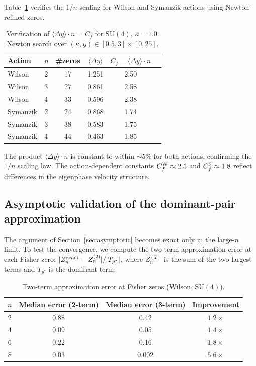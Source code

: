 \documentclass[12pt]{article}
\theoremstyle{definition}
\theoremstyle{remark}
\newcommand{\SU}{\mathrm{SU}}
\newcommand{\avg}[1]{\langle #1 \rangle}
\begin{document}
Table~\ref{tab:scaling} verifies the $1/n$ scaling for Wilson and
Symanzik actions using Newton-refined zeros.

\begin{table}[h]
\centering
\caption{Verification of $\avg{\Delta y} \cdot n = C_f$ for
  $\SU(4)$, $\kappa = 1.0$.  Newton search over
  $(\kappa, y) \in [0.5, 3] \times [0, 25]$.}
\label{tab:scaling}
\begin{tabular}{llcccc}
\toprule
Action & $n$ & \#zeros & $\avg{\Delta y}$ & $C_f = \avg{\Delta y}\cdot n$ \\
\midrule
Wilson   & 2 & 17 & 1.251 & 2.50 \\
Wilson   & 3 & 27 & 0.861 & 2.58 \\
Wilson   & 4 & 33 & 0.596 & 2.38 \\
\midrule
Symanzik & 2 & 24 & 0.868 & 1.74 \\
Symanzik & 3 & 38 & 0.583 & 1.75 \\
Symanzik & 4 & 44 & 0.463 & 1.85 \\
\bottomrule
\end{tabular}
\end{table}

The product $\avg{\Delta y} \cdot n$ is constant to within ${\sim}5\%$
for both actions, confirming the $1/n$ scaling law.  The
action-dependent constants $C_f^{\rm W} \approx 2.5$ and
$C_f^{\rm S} \approx 1.8$ reflect differences in the eigenphase
velocity structure.

\subsection{Asymptotic validation of the dominant-pair approximation}

The argument of Section~\ref{sec:asymptotic} becomes exact only in
the large-$n$ limit.  To test the convergence, we compute the
two-term approximation error at each Fisher zero:
$|Z_n^{\rm exact} - Z_n^{(2)}|/|T_{p^*}|$, where $Z_n^{(2)}$ is the
sum of the two largest terms and $T_{p^*}$ is the dominant term.

\begin{table}[h]
\centering
\caption{Two-term approximation error at Fisher zeros (Wilson, $\SU(4)$).}
\label{tab:asymptotic}
\begin{tabular}{cccc}
\toprule
$n$ & Median error (2-term) & Median error (3-term) & Improvement \\
\midrule
2 & 0.88 & 0.42 & $1.2\times$ \\
4 & 0.09 & 0.05 & $1.4\times$ \\
6 & 0.22 & 0.16 & $1.8\times$ \\
8 & 0.03 & 0.002 & $5.6\times$ \\
\bottomrule
\end{tabular}
\end{table}
\end{document}
